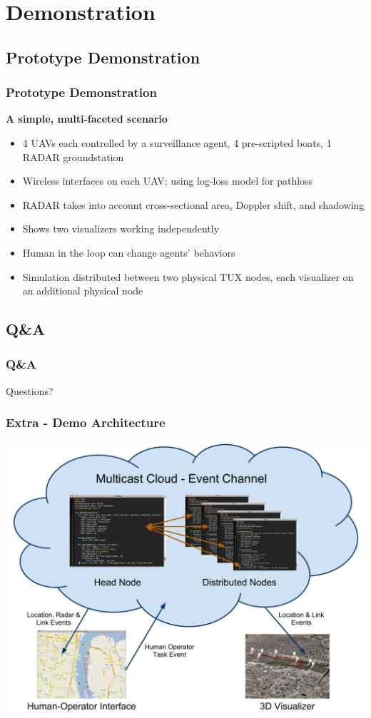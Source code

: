 \documentclass[mathserif]{beamer}
\begin{document}
\section{Demonstration}
\subsection{Prototype Demonstration}
\frame
{
    \frametitle{Prototype Demonstration}
    \textbf{A simple, multi-faceted scenario}
    \begin{itemize}
        \item 4 UAVs each controlled by a surveillance agent, 4 pre-scripted boats, 1 RADAR groundstation
        \item Wireless interfaces on each UAV; using log-loss model for pathloss
        \item RADAR takes into account cross-sectional area, Doppler shift, and shadowing
        \item Shows two visualizers working independently
        \item Human in the loop can change agents' behaviors
        \item Simulation distributed between two physical TUX nodes, each visualizer on an additional physical node
    \end{itemize}
}

\subsection{Q\&A}
\frame
{
    \frametitle{Q\&A}
    \begin{center} 
        \Huge Questions? 
    \end{center}
}

\frame
{
    \frametitle{Extra - Demo Architecture}
    \begin{center}
        \includegraphics[scale=.48]{demo.pdf}
    \end{center}
}
\end{document}
